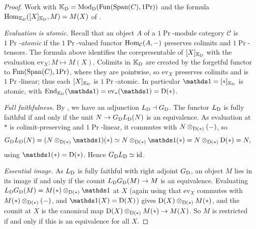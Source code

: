 \documentclass[11pt]{book}
\begin{document}
	\begin{proof}
		Work with $\mathbb{K}_{\operatorname{\mathrm{D}}} = {\textup{Mod}}_{\operatorname{\mathrm{D}}}(\operatorname{Fun}(\operatorname{Span}(C),1\textup{Pr}))$ and the formula $\operatorname{Hom}_{\mathbb{K}_{\operatorname{\mathrm{D}}}}([X]_{\mathbb{K}_{\operatorname{\mathrm{D}}}}, M) = M(X)$ of .

		\emph{Evaluation is atomic.} Recall that an object $A$ of a $1\Pr$-module category $\mathcal C$ is \emph{$1\Pr$-atomic} if the $1\Pr$-valued functor $\operatorname{Hom}_{\mathcal C}(A,-)$ preserves colimits and $1\Pr$-tensors. The formula above identifies the corepresentable of $[X]_{\mathbb{K}_{\operatorname{\mathrm{D}}}}$ with the evaluation $\mathrm{ev}_X\colon M\mapsto M(X)$. Colimits in $\mathbb{K}_{\operatorname{\mathrm{D}}}$ are created by the forgetful functor to $\operatorname{Fun}(\operatorname{Span}(C),1\textup{Pr})$, where they are pointwise, so $\mathrm{ev}_X$ preserves colimits and is $1\Pr$-linear; thus each $[X]_{\mathbb{K}_{\operatorname{\mathrm{D}}}}$ is $1\Pr$-atomic. In particular $\unit = [*]_{\bbK_{\D}}$ is atomic, with $\End_{\bbK_{\D}}(\unit) = \mathrm{ev}_*(\unit) = \D(*)$.

		\emph{Full faithfulness.} By , we have an adjunction $L_{\operatorname{\mathrm{D}}}\dashv G_{\operatorname{\mathrm{D}}}$. The functor $L_{\operatorname{\mathrm{D}}}$ is fully faithful if and only if the unit $N\to G_{\operatorname{\mathrm{D}}}L_{\operatorname{\mathrm{D}}}(N)$ is an equivalence. As evaluation at $*$ is colimit-preserving and $1\Pr$-linear, it commutes with $N\otimes_{\operatorname{\mathrm{D}}(*)}(-)$, so
		\[
			G_{\D}L_{\D}(N) = (N\otimes_{\D(*)}\unit)(*) \simeq N\otimes_{\D(*)}\unit(*) = N\otimes_{\D(*)}\D(*) = N,
		\]
		using $\unit(*) = \D(*)$. Hence $G_{\operatorname{\mathrm{D}}}L_{\operatorname{\mathrm{D}}}\simeq\operatorname{id}$.

		\emph{Essential image.} As $L_{\operatorname{\mathrm{D}}}$ is fully faithful with right adjoint $G_{\operatorname{\mathrm{D}}}$, an object $M$ lies in its image if and only if the counit $L_{\operatorname{\mathrm{D}}}G_{\operatorname{\mathrm{D}}}(M)\to M$ is an equivalence. Evaluating $L_{\D}G_{\D}(M) = M(*)\otimes_{\D(*)}\unit$ at $X$ (again using that $\mathrm{ev}_X$ commutes with $M(*)\otimes_{\operatorname{\mathrm{D}}(*)}(-)$, and $\unit(X) = \D(X)$) gives $\operatorname{\mathrm{D}}(X)\otimes_{\operatorname{\mathrm{D}}(*)}M(*)$, and the counit at $X$ is the canonical map $\operatorname{\mathrm{D}}(X)\otimes_{\operatorname{\mathrm{D}}(*)}M(*)\to M(X)$. So $M$ is restricted if and only if this is an equivalence for all $X$.
	\end{proof}
\end{document}
